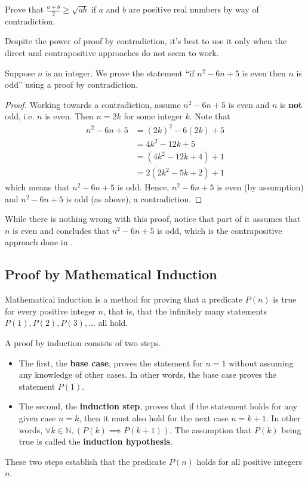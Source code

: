 \begin{exercise}
    Prove that $\frac{a+b}{2} \geq \sqrt{ab}$ if $a$ and $b$ are positive real numbers by way of contradiction.
\end{exercise}

Despite the power of proof by contradiction, it's best to use it only when the direct and contrapositive approaches do not seem to work.
\begin{example}
    Suppose $n$ is an integer. We prove the statement ``if $n^2 - 6n + 5$ is even then $n$ is odd'' using a proof by contradiction.
    \begin{proof}
        Working towards a contradiction, assume $n^2 - 6n + 5$ is even and $n$ is \textbf{not} odd, i.e. $n$ is even. Then $n = 2k$ for some integer $k$. Note that
        \begin{align*}
            n^2 - 6n + 5 &= (2k)^2 - 6(2k) + 5\\
            &= 4k^2 - 12k + 5\\
            &= (4k^2 - 12k + 4) + 1\\
            &= 2(2k^2 - 5k + 2) + 1
        \end{align*}
        which means that $n^2 - 6n + 5$ is odd. Hence, $n^2 - 6n + 5$ is even (by assumption) and $n^2 - 6n + 5$ is odd (as above), a contradiction.
    \end{proof}
    While there is nothing wrong with this proof, notice that part of it assumes that $n$ is even and concludes that  $n^2 - 6n + 5$ is odd, which is the contrapositive approach done in .
\end{example}

\subsection{Proof by Mathematical Induction}
Mathematical induction is a method for proving that a predicate $P(n)$ is true for every positive integer $n$, that is, that the infinitely many statements $P(1), P(2), P(3), \dots$ all hold.

A proof by induction consists of two steps.
\begin{itemize}
    \item The first, the \textbf{base case}, proves the statement for $n = 1$ without assuming any knowledge of other cases. In other words, the base case proves the statement $P(1)$. 
    \item The second, the \textbf{induction step}, proves that if the statement holds for any given case $n = k$, then it must also hold for the next case $n = k + 1$. In other words, $\forall k \in \mathbb{N}, (P(k) \implies P(k+1))$. The assumption that $P(k)$ being true is called the \textbf{induction hypothesis}.
\end{itemize}
These two steps establish that the predicate $P(n)$ holds for all positive integers $n$.

